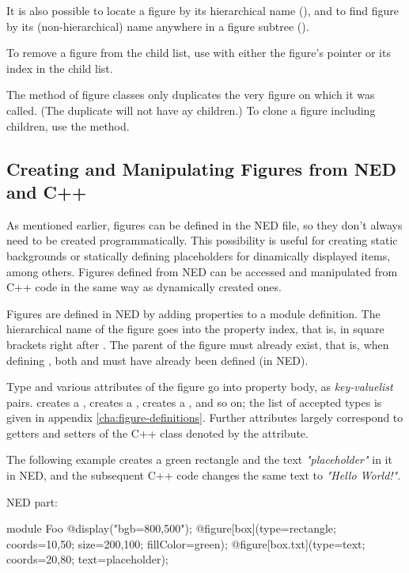 It is also possible to locate a figure by its hierarchical name
(), and to find figure by its (non-hierarchical)
name anywhere in a figure subtree ().

To remove a figure from the child list, use  with
either the figure's pointer or its index in the child list.

The  method of figure classes only duplicates the very figure
on which it was called. (The duplicate will not have ay children.) To clone
a figure including children, use the  method.


\subsection{Creating and Manipulating Figures from NED and C++}
\label{sec:graphics:creating-and-manipulating-figures}

As mentioned earlier, figures can be defined in the NED file, so they
don't always need to be created programmatically. This possibility is
useful for creating static backgrounds or statically defining placeholders
for dinamically displayed items, among others. Figures defined from NED can
be accessed and manipulated from C++ code in the same way as dynamically
created ones.

Figures are defined in NED by adding  properties to a module definition.
The hierarchical name of the figure goes into the property index, that is, in
square brackets right after . The parent of the figure must
already exist, that is, when defining , both  and
 must have already been defined (in NED).

Type and various attributes of the figure go into property body, as
\textit{key-valuelist} pairs.  creates a
,  creates a
,  creates a ,
and so on; the list of accepted types is given in appendix
\ref{cha:figure-definitions}. Further attributes largely correspond to
getters and setters of the C++ class denoted by the  attribute.

The following example creates a green rectangle and the text
\textit{"placeholder"} in it in NED, and the subsequent C++ code changes
the same text to \textit{"Hello World!"}.

NED part:

\begin{ned}
module Foo
{
    @display("bgb=800,500");
    @figure[box](type=rectangle; coords=10,50; size=200,100; fillColor=green);
    @figure[box.txt](type=text; coords=20,80; text=placeholder);
}
\end{ned}

